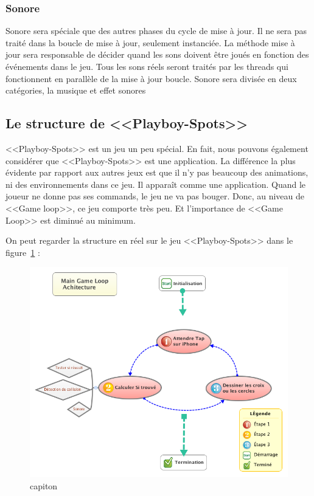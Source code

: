 
\subsubsection{Sonore} %
\label{ssub:sonore}

Sonore sera spéciale que des autres phases du cycle de mise à jour. Il ne sera pas traité dans la boucle de mise à jour, seulement instanciée. La méthode mise à jour sera responsable de décider quand les sons doivent être joués en fonction des événements dans le jeu. Tous les sons réels seront traités par les threads qui fonctionnent en parallèle de la mise à jour boucle. Sonore sera divisée en deux catégories, la musique et effet sonores



\subsection{Le structure de <<Playboy-Spots>>} %
\label{sub:le_structure_de_playboy_spots_}

<<Playboy-Spots>> est un jeu un peu spécial. En fait, nous pouvons également considérer que <<Playboy-Spots>> est une application. La différence la plus évidente par rapport aux autres jeux est que il n'y pas beaucoup des animations, ni des environnements dans ce jeu. Il apparaît comme une application. Quand le joueur ne donne pas ses commands, le jeu ne va pas bouger. Donc, au niveau de <<Game loop>>, ce jeu comporte très peu. Et l'importance de <<Game Loop>> est diminué au minimum. 

On peut regarder la structure en réel sur le jeu <<Playboy-Spots>> dans le figure~\ref{fig:XMinds_AchitecturePlayboy} :
\begin{figure}[htbp]
	\centering
		\includegraphics[width=6in]{XMinds/AchitecturePlayboy.png}
	\caption{capiton}
	\label{fig:XMinds_AchitecturePlayboy}
\end{figure}
 

